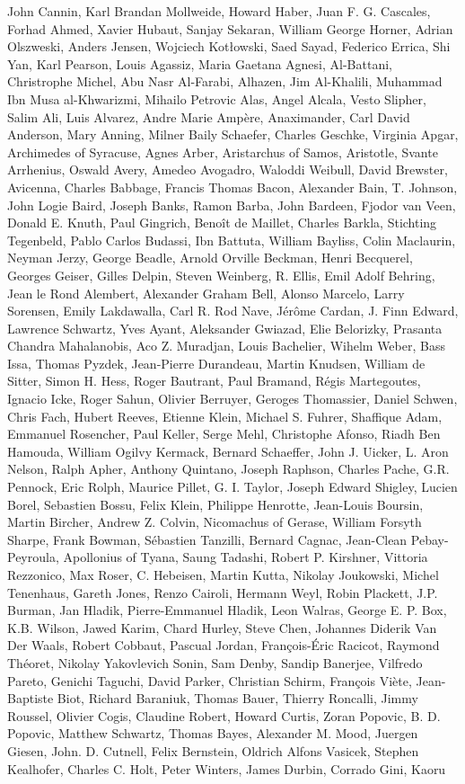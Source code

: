 \begin{spacing}{0.5}
\begin{tiny}
	John Cannin, Karl Brandan Mollweide, Howard Haber, Juan F. G. Cascales, Forhad Ahmed, Xavier Hubaut, Sanjay Sekaran, William George Horner, Adrian Olszweski, Anders Jensen, Wojciech Kotłowski, Saed Sayad, Federico Errica, Shi Yan, Karl Pearson, Louis Agassiz, Maria Gaetana Agnesi, Al-Battani, Christrophe Michel, Abu Nasr Al-Farabi, Alhazen, Jim Al-Khalili, Muhammad Ibn Musa al-Khwarizmi, Mihailo Petrovic Alas, Angel Alcala, Vesto Slipher, Salim Ali, Luis Alvarez, Andre Marie Ampère, Anaximander, Carl David Anderson, Mary Anning, Milner Baily Schaefer, Charles Geschke, Virginia Apgar, Archimedes of Syracuse, Agnes Arber, Aristarchus of Samos, Aristotle, Svante Arrhenius, Oswald Avery, Amedeo Avogadro, Waloddi Weibull, David Brewster, Avicenna, Charles Babbage, Francis Thomas Bacon, Alexander Bain, T. Johnson, John Logie Baird, Joseph Banks, Ramon Barba, John Bardeen, Fjodor van Veen, Donald E. Knuth, Paul Gingrich, Benoît de Maillet, Charles Barkla, Stichting Tegenbeld, Pablo Carlos Budassi, Ibn Battuta, William Bayliss, Colin Maclaurin, Neyman Jerzy, George Beadle, Arnold Orville Beckman, Henri Becquerel, Georges Geiser, Gilles Delpin, Steven Weinberg, R. Ellis, Emil Adolf Behring, Jean le Rond Alembert, Alexander Graham Bell, Alonso Marcelo, Larry Sorensen, Emily Lakdawalla, Carl R. Rod Nave, Jérôme Cardan, J. Finn Edward, Lawrence Schwartz, Yves Ayant, Aleksander Gwiazad, Elie Belorizky, Prasanta Chandra Mahalanobis, Aco Z. Muradjan, Louis Bachelier, Wihelm Weber, Bass Issa, Thomas Pyzdek, Jean-Pierre Durandeau, Martin Knudsen, William de Sitter, Simon H. Hess, Roger Bautrant, Paul Bramand, Régis Martegoutes, Ignacio Icke, Roger Sahun, Olivier Berruyer, Geroges Thomassier, Daniel Schwen, Chris Fach, Hubert Reeves, Etienne Klein, Michael S. Fuhrer, Shaffique Adam, Emmanuel Rosencher, Paul Keller, Serge Mehl, Christophe Afonso, Riadh Ben Hamouda, William Ogilvy Kermack, Bernard Schaeffer, John J. Uicker, L. Aron Nelson, Ralph Apher, Anthony Quintano, Joseph Raphson, Charles Pache, G.R. Pennock, Eric Rolph, Maurice Pillet, G. I. Taylor, Joseph Edward Shigley, Lucien Borel, Sebastien Bossu, Felix Klein, Philippe Henrotte, Jean-Louis Boursin, Martin Bircher, Andrew Z. Colvin, Nicomachus of Gerase, William Forsyth Sharpe, Frank Bowman, Sébastien Tanzilli, Bernard Cagnac, Jean-Clean Pebay-Peyroula, Apollonius of Tyana, Saung Tadashi, Robert P. Kirshner, Vittoria Rezzonico, Max Roser, C. Hebeisen, Martin Kutta, Nikolay Joukowski, Michel Tenenhaus, Gareth Jones, Renzo Cairoli, Hermann Weyl, Robin Plackett, J.P. Burman, Jan Hladik, Pierre-Emmanuel Hladik, Leon Walras, George E. P. Box, K.B. Wilson, Jawed Karim, Chard Hurley, Steve Chen, Johannes Diderik Van Der Waals, Robert Cobbaut, Pascual Jordan, François-Éric Racicot, Raymond Théoret, Nikolay Yakovlevich Sonin, Sam Denby, Sandip Banerjee, Vilfredo Pareto, Genichi Taguchi, David Parker, Christian Schirm, François Viète, Jean-Baptiste Biot,  Richard Baraniuk, Thomas Bauer, Thierry Roncalli, Jimmy Roussel, Olivier Cogis, Claudine Robert, Howard Curtis, Zoran Popovic, B. D. Popovic, Matthew Schwartz, Thomas Bayes, Alexander M. Mood, Juergen Giesen, John. D. Cutnell, Felix Bernstein, Oldrich Alfons Vasicek, Stephen Kealhofer, Charles C. Holt, Peter Winters, James Durbin, Corrado Gini, Kaoru 
\end{tiny}
\end{spacing}
